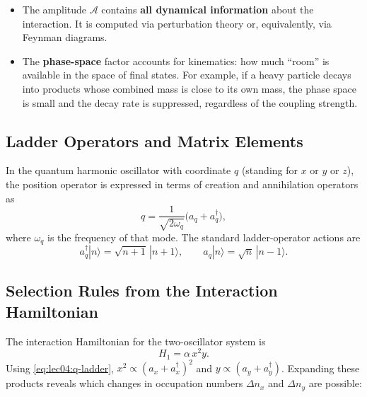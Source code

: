 \begin{itemize}
  \item The amplitude $\mathcal{A}$ contains \textbf{all dynamical information} about the interaction.  It is computed via perturbation theory or, equivalently, via Feynman diagrams.
  \item The \textbf{phase-space} factor accounts for kinematics: how much ``room'' is available in the space of final states.  For example, if a heavy particle decays into products whose combined mass is close to its own mass, the phase space is small and the decay rate is suppressed, regardless of the coupling strength.
\end{itemize}

\subsection*{Ladder Operators and Matrix Elements}

In the quantum harmonic oscillator with coordinate $q$ (standing for $x$ or $y$ or $z$), the position operator is expressed in terms of creation and annihilation operators as
\begin{equation}
  q
  = \frac{1}{\sqrt{2\omega_q}}
    \bigl(a_q + a_q^\dagger\bigr),
  \label{eq:lec04:q-ladder}
\end{equation}
where $\omega_q$ is the frequency of that mode.  The standard ladder-operator actions are
\begin{equation}
  a_q^\dagger |n\rangle = \sqrt{n+1}\,|n+1\rangle,
  \qquad
  a_q |n\rangle = \sqrt{n}\,|n-1\rangle.
  \label{eq:lec04:ladder-actions}
\end{equation}

\subsection*{Selection Rules from the Interaction Hamiltonian}

The interaction Hamiltonian for the two-oscillator system is
\begin{equation}
  H_1 = \alpha\, x^2 y.
  \label{eq:lec04:H1-two}
\end{equation}
Using \eqref{eq:lec04:q-ladder}, $x^2 \propto (a_x + a_x^\dagger)^2$ and $y \propto (a_y + a_y^\dagger)$.  Expanding these products reveals which changes in occupation numbers $\Delta n_x$ and $\Delta n_y$ are possible:

